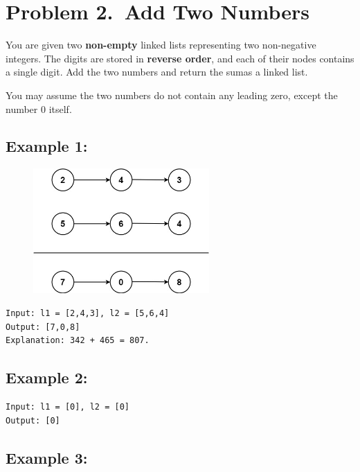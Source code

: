 
\section*{Problem 2.~Add Two Numbers}

You are given two \textbf{non-empty} linked lists representing two non-negative integers. The digits are stored in \textbf{reverse order}, and each of their nodes contains a single digit. Add the two numbers and return the sumas a linked list.

You may assume the two numbers do not contain any leading zero, except the number 0 itself.


\subsection*{Example 1:}

\begin{figure}[h!]
  \includegraphics[width=0.6\textwidth]{img/addtwonumber1.jpg}
  \centering
\end{figure}

\begin{lstlisting}
Input: l1 = [2,4,3], l2 = [5,6,4]
Output: [7,0,8]
Explanation: 342 + 465 = 807.
\end{lstlisting}


\subsection*{Example 2:}

\begin{lstlisting}
Input: l1 = [0], l2 = [0]
Output: [0]
\end{lstlisting}


\subsection*{Example 3:}

